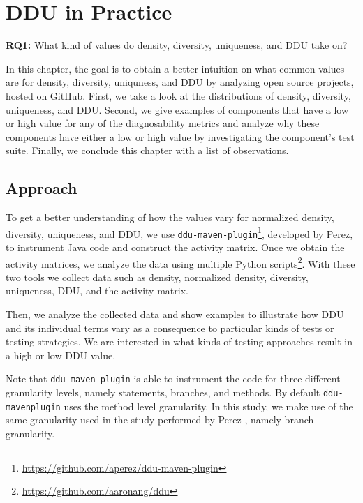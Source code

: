 \documentclass[twoside,a4paper,11pt]{memoir}
\begin{document}
\chapter{DDU in Practice}
\label{ch:rq1}
\begin{framed}
\noindent
\textbf{RQ1:} What kind of values do density, diversity, uniqueness, and DDU take on?
\end{framed}
In this chapter, the goal is to obtain a better intuition on what common values are for density, diversity, uniquness, and DDU by analyzing open source projects, hosted on GitHub.
First, we take a look at the distributions of density, diversity, uniqueness, and DDU.
Second, we give examples of components that have a low or high value for any of the diagnosability metrics and analyze why these components have either a low or high value by investigating the component's test suite.
Finally, we conclude this chapter with a list of observations.

\section{Approach}
To get a better understanding of how the values vary for normalized density, diversity, uniqueness, and DDU, we use \texttt{ddu-maven-plugin}\footnote{\url{https://github.com/aperez/ddu-maven-plugin}}, developed by Perez, to instrument Java code and construct the activity matrix.
Once we obtain the activity matrices, we analyze the data using multiple Python scripts\footnote{\url{https://github.com/aaronang/ddu}}.
With these two tools we collect data such as density, normalized density, diversity, uniqueness, DDU, and the activity matrix.

Then, we analyze the collected data and show examples to illustrate how DDU and its individual terms vary as a consequence to particular kinds of tests or testing strategies.
We are interested in what kinds of testing approaches result in a high or low DDU value.

Note that \texttt{ddu-maven-plugin} is able to instrument the code for three different granularity levels, namely statements, branches, and methods.
By default \texttt{ddu-maven\-plugin} uses the method level granularity.
In this study, we make use of the same granularity used in the study performed by Perez \etal \cite{DBLP:conf/icse/PerezAD17}, namely branch granularity.
\end{document}

